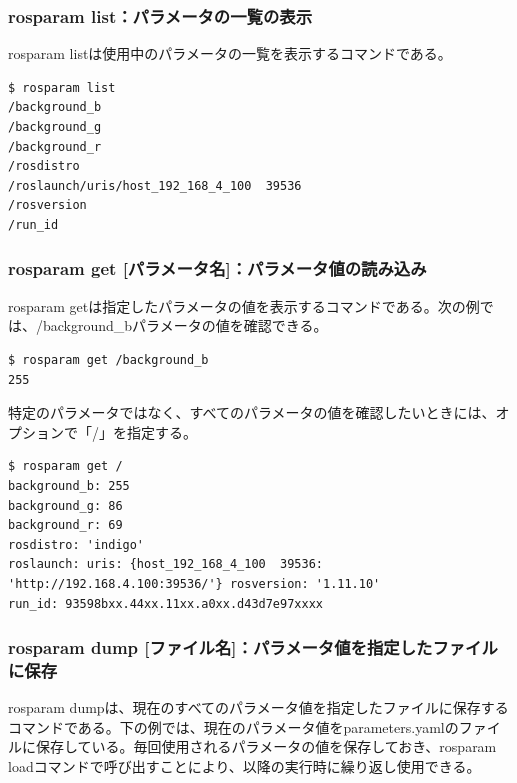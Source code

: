 \subsubsection{rosparam list：パラメータの一覧の表示}

rosparam listは使用中のパラメータの一覧を表示するコマンドである。

\begin{lstlisting}[language=ROS]
$ rosparam list
/background_b
/background_g
/background_r
/rosdistro
/roslaunch/uris/host_192_168_4_100  39536
/rosversion
/run_id
\end{lstlisting}

\subsubsection{rosparam get [パラメータ名]：パラメータ値の読み込み}

rosparam getは指定したパラメータの値を表示するコマンドである。次の例では、/background\_bパラメータの値を確認できる。

\begin{lstlisting}[language=ROS]
$ rosparam get /background_b
255
\end{lstlisting}

特定のパラメータではなく、すべてのパラメータの値を確認したいときには、オプションで「/」を指定する。

\begin{lstlisting}[language=ROS]
$ rosparam get /
background_b: 255
background_g: 86
background_r: 69
rosdistro: 'indigo'
roslaunch: uris: {host_192_168_4_100  39536: 'http://192.168.4.100:39536/'} rosversion: '1.11.10'
run_id: 93598bxx.44xx.11xx.a0xx.d43d7e97xxxx
\end{lstlisting}

\subsubsection{rosparam dump [ファイル名]：パラメータ値を指定したファイルに保存}

rosparam dumpは、現在のすべてのパラメータ値を指定したファイルに保存するコマンドである。下の例では、現在のパラメータ値をparameters.yamlのファイルに保存している。毎回使用されるパラメータの値を保存しておき、rosparam loadコマンドで呼び出すことにより、以降の実行時に繰り返し使用できる。

